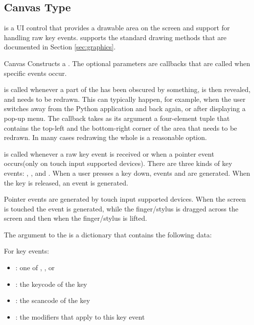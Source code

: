 \subsection{Canvas Type}
\label{subsec:canvas}
 is a UI control that provides a drawable area on the screen 
and support for handling raw key events.  supports the 
standard drawing methods that are documented in Section \ref{sec:graphics}.

\begin{classdesc}{Canvas}{}
Constructs a . The optional parameters are callbacks
that are called when specific events occur. 


 is called whenever a part of the  
has been obscured by something, is then revealed, and needs to be
redrawn. This can typically happen, for example, when the user
switches away from the Python application and back again, or after
displaying a pop-up menu. The callback takes as its argument a
four-element tuple that contains the top-left and the bottom-right
corner of the area that needs to be redrawn. In many cases redrawing
the whole
 is a reasonable option. 

 is called whenever a raw key event is received or when a 
pointer event occurs(only on touch input supported devices).
There are three kinds of key events: ,
, and . When a user presses a key 
down, events  and  are generated. 
When the key is released, an  event is generated.

Pointer events are generated by touch input supported devices. When the screen
is touched the  event is generated,  while the
finger/stylus is dragged across the screen and then  when the
finger/stylus is lifted.

The argument to the  is a dictionary that contains 
the following data:

For key events:
\begin{itemize}
\item {}: one of , , or 
\item {}: the keycode of the key
\item {}: the scancode of the key
\item {}: the modifiers that apply to this key event
\end{itemize}


\end{classdesc}
